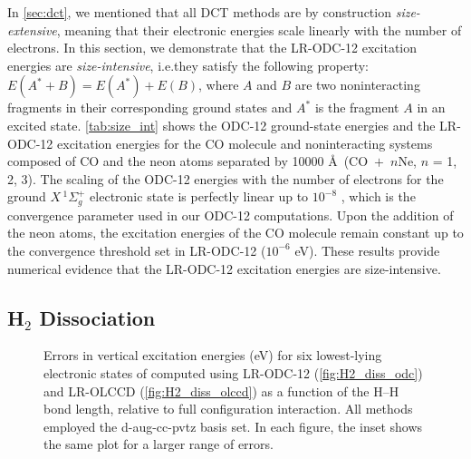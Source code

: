 In \cref{sec:dct}, we mentioned that all DCT methods are by construction {\it
size-extensive}, meaning that their electronic energies scale linearly with the
number of electrons.
In this section, we demonstrate that the LR-ODC-12 excitation energies are {\it size-intensive}, i.e.\@ they satisfy the following property: $E(A^*+B) = E(A^*) + E(B)$, where $A$ and $B$ are two noninteracting fragments in their corresponding ground states and $A^*$ is the fragment $A$ in an excited state. \cref{tab:size_int} shows the ODC-12 ground-state energies and the LR-ODC-12 excitation energies for the CO molecule and noninteracting systems composed of CO and the neon atoms separated by 10000 \AA\ (\mbox{CO $+$ $n$Ne}, $n$ = 1, 2, 3). The scaling of the ODC-12 energies with the number of electrons for the ground \({X}\,^1\Sigma_g^+\) electronic state is perfectly linear up to $10^{-8}$ \hartree, which is the convergence parameter used in our ODC-12 computations. Upon the addition of the neon atoms, the excitation energies of the CO molecule remain constant up to the convergence threshold set in LR-ODC-12 ($10^{-6}$  eV). These results provide numerical evidence that the LR-ODC-12 excitation energies are size-intensive.


\subsection{H$_2$ Dissociation}
\label{sec:two_electron}

\begin{figure}[t]
    \centering
   \label{fig:H2_diss}
    \qquad
    \quad
   \captionsetup{justification=raggedright,singlelinecheck=false}
   \caption{Errors in vertical excitation energies (eV) for six lowest-lying electronic states of  computed using LR-ODC-12 (\ref{fig:H2_diss_odc}) and LR-OLCCD (\ref{fig:H2_diss_olccd}) as a function of the H--H bond length, relative to full configuration interaction. All methods employed the d-aug-cc-pvtz basis set. In each figure, the inset shows the same plot for a larger range of errors.}
   \label{fig:algorithm_errors}
\end{figure}

